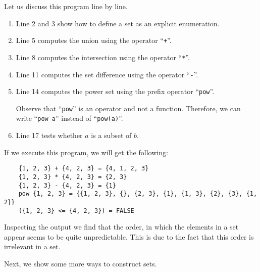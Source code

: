 \noindent
Let us discuss this program line by line.
\begin{enumerate}
\item Line 2 and 3 show how to define a set as an explicit enumeration.
\item Line 5 computes the union using the operator ``\texttt{+}''.
\item Line 8 computes the intersection using the operator ``\texttt{*}''.
\item Line 11 computes the set difference using the operator ``\texttt{-}''.
\item Line 14 computes the power set using the prefix operator ``\texttt{pow}''.

      Observe that ``\texttt{pow}'' is an operator and not a function.
      Therefore, we can write ``\texttt{pow a}'' instead of ``\texttt{pow(a)}''.
\item Line 17 tests whether $a$ is a subset of $b$.
\end{enumerate}
If we execute this program, we will get the following:
\begin{verbatim}
    {1, 2, 3} + {4, 2, 3} = {4, 1, 2, 3}
    {1, 2, 3} * {4, 2, 3} = {2, 3}
    {1, 2, 3} - {4, 2, 3} = {1}
    pow {1, 2, 3} = {{1, 2, 3}, {}, {2, 3}, {1}, {1, 3}, {2}, {3}, {1, 2}}
    ({1, 2, 3} <= {4, 2, 3}) = FALSE
\end{verbatim}
Inspecting the output we find that the order, in which the elements in a set appear
seems to be quite unpredictable.  This is due to the fact that this order is irrelevant in
a set.

Next, we show some more ways to construct sets.

